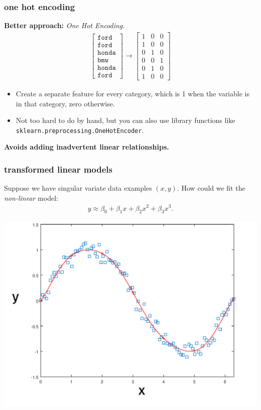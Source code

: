 \documentclass[handout,compress]{beamer}
\begin{document}
\begin{frame}
	\frametitle{one hot encoding}
	\textbf{Better approach:} \emph{One Hot Encoding.}
	\begin{align*}
	\begin{bmatrix}
	\texttt{ford} \\\texttt{ford} \\ \texttt{honda} \\ \texttt{bmw} \\ \texttt{honda} \\ \texttt{ford}
	\end{bmatrix} \rightarrow 
	\begin{bmatrix}
	1 & 0 & 0 \\1 & 0 & 0 \\ 0 & 1 & 0 \\ 0 & 0 & 1\\ 0 & 1 & 0 \\ 1 & 0 & 0
	\end{bmatrix}
	\end{align*}
	\begin{itemize}
	\item Create a separate feature for every category, which is 1 when the variable is in that category, zero otherwise.
	\item Not too hard to do by hand, but you can also use library functions like \texttt{\small sklearn.preprocessing.OneHotEncoder}.
	\end{itemize}
	\begin{center}
		\large \alert{\textbf{Avoids adding inadvertent linear relationships.}}
	\end{center}
\end{frame}

\begin{frame}
	\frametitle{transformed linear models}
	Suppose we have singular variate data examples $(x, y)$. How could we fit the \emph{non-linear} model:
	\begin{align*}
	y \approx \beta_0 + \beta_1 x +  \beta_2 x^2 +  \beta_3 x^3.
	\end{align*}
	\begin{center}
		\includegraphics[width=.6\textwidth]{poly_fit.png}
	\end{center}
\end{frame}
\end{document}
